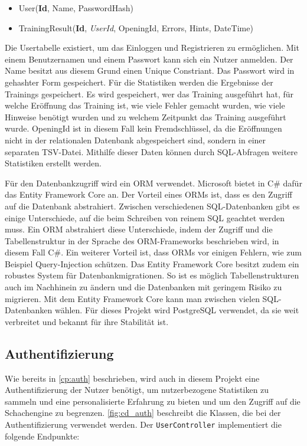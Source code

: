 \begin{itemize}
  \item User(\textbf{Id}, Name, PasswordHash)
  \item TrainingResult(\textbf{Id}, \textit{UserId}, OpeningId, Errors, Hints, DateTime)
\end{itemize}

Die Usertabelle existiert, um das Einloggen und Registrieren zu ermöglichen. Mit einem Benutzernamen und einem Passwort kann sich ein Nutzer anmelden. Der Name besitzt aus diesem Grund einen Unique Constriant. Das Passwort wird in gehashter Form gespeichert. Für die Statistiken werden die Ergebnisse der Trainings gespeichert. Es wird gespeichert, wer das Training ausgeführt hat, für welche Eröffnung das Training ist, wie viele Fehler gemacht wurden, wie viele Hinweise benötigt wurden und zu welchem Zeitpunkt das Training ausgeführt wurde. OpeningId ist in diesem Fall kein Fremdschlüssel, da die Eröffnungen nicht in der relationalen Datenbank abgespeichert sind, sondern in einer separaten TSV-Datei. Mithilfe dieser Daten können durch SQL-Abfragen weitere Statistiken erstellt werden.

Für den Datenbankzugriff wird ein \ac{ORM} verwendet. Microsoft bietet in C\# dafür das Entity Framework Core an. Der Vorteil eines \ac{ORM}s ist, dass es den Zugriff auf die Datenbank abstrahiert. Zwischen verschiedenen SQL-Datenbanken gibt es einige Unterschiede, auf die beim Schreiben von reinem SQL geachtet werden muss. Ein \ac{ORM} abstrahiert diese Unterschiede, indem der Zugriff und die Tabellenstruktur in der Sprache des ORM-Frameworks beschrieben wird, in diesem Fall C\#. Ein weiterer Vorteil ist, dass \ac{ORM}s vor einigen Fehlern, wie zum Beispiel Query-Injection schützen. Das Entity Framework Core besitzt zudem ein robustes System für Datenbankmigrationen. So ist es möglich Tabellenstrukturen auch im Nachhinein zu ändern und die Datenbanken mit geringem Risiko zu migrieren. Mit dem Entity Framework Core kann man zwischen vielen SQL-Datenbanken wählen. Für dieses Projekt wird PostgreSQL verwendet, da sie weit verbreitet und bekannt für ihre Stabilität ist.

\subsection{Authentifizierung}
Wie bereits in \autoref{cp:auth} beschrieben, wird auch in diesem Projekt eine Authentifizierung der Nutzer benötigt, um nutzerbezogene Statistiken zu sammeln und eine personalisierte Erfahrung zu bieten und um den Zugriff auf die Schachengine zu begrenzen. \autoref{fig:cd_auth} beschreibt die Klassen, die bei der Authentifizierung verwendet werden. Der \lstinline{UserController} implementiert die folgende Endpunkte:

